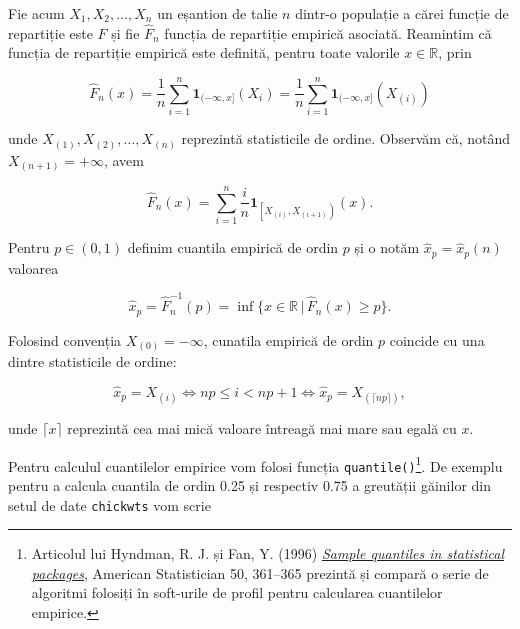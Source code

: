 \documentclass[]{article}
\newenvironment{Shaded}{\begin{snugshade}}{\end{snugshade}}
\newcommand{\KeywordTok}[1]{\textcolor[rgb]{0.13,0.29,0.53}{\textbf{#1}}}
\newcommand{\DataTypeTok}[1]{\textcolor[rgb]{0.13,0.29,0.53}{#1}}
\newcommand{\DecValTok}[1]{\textcolor[rgb]{0.00,0.00,0.81}{#1}}
\newcommand{\FloatTok}[1]{\textcolor[rgb]{0.00,0.00,0.81}{#1}}
\newcommand{\StringTok}[1]{\textcolor[rgb]{0.31,0.60,0.02}{#1}}
\newcommand{\OperatorTok}[1]{\textcolor[rgb]{0.81,0.36,0.00}{\textbf{#1}}}
\newcommand{\NormalTok}[1]{#1}
\let\rmarkdownfootnote\footnote%
\def\footnote{\protect\rmarkdownfootnote}
\begin{document}
Fie acum \(X_1,X_2,\ldots,X_n\) un eșantion de talie \(n\) dintr-o
populație a cărei funcție de repartiție este \(F\) și fie \(\hat{F}_n\)
funcția de repartiție empirică asociată. Reamintim că funcția de
repartiție empirică este definită, pentru toate valorile
\(x\in\mathbb{R}\), prin

\[
  \hat{F}_n(x) = \frac{1}{n}\sum_{i = 1}^{n}\mathbf{1}_{(-\infty, x]}(X_i) = \frac{1}{n}\sum_{i = 1}^{n}\mathbf{1}_{(-\infty, x]}(X_{(i)})
\]

unde \(X_{(1)}, X_{(2)}, \ldots, X_{(n)}\) reprezintă statisticile de
ordine. Observăm că, notând \(X_{(n+1)} = +\infty\), avem

\[
  \hat{F}_n(x) = \sum_{i = 1}^{n}\frac{i}{n}\mathbf{1}_{\left[X_{(i)}, X_{(i+1)}\right)}(x).
\]

Pentru \(p\in(0,1)\) definim cuantila empirică de ordin \(p\) și o notăm
\(\hat{x}_p = \hat{x}_p(n)\) valoarea

\[
  \hat{x}_p = \hat{F}_n^{-1}(p) = \inf\{x\in\mathbb{R}\,|\,\hat{F}_n(x)\geq p\}.
\]

Folosind convenția \(X_{(0)}=-\infty\), cunatila empirică de ordin \(p\)
coincide cu una dintre statisticile de ordine:

\[
  \hat{x}_p = X_{(i)} \iff np\leq i< np+1 \iff \hat{x}_p = X_{(\lceil np \rceil)},
\]

unde \(\lceil x \rceil\) reprezintă cea mai mică valoare întreagă mai
mare sau egală cu \(x\).

Pentru calculul cuantilelor empirice vom folosi funcția
\texttt{quantile()}\footnote{Articolul lui Hyndman, R. J. și Fan, Y.
  (1996) \href{readings/Sample\%20Quantiles.pdf}{\emph{Sample quantiles
  in statistical packages}}, American Statistician 50, 361--365 prezintă
  și compară o serie de algoritmi folosiți în soft-urile de profil
  pentru calcularea cuantilelor empirice.}. De exemplu pentru a calcula
cuantila de ordin 0.25 și respectiv 0.75 a greutății găinilor din setul
de date \texttt{chickwts} vom scrie

\begin{Shaded}
\end{Shaded}
\end{document}
